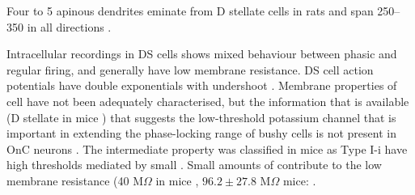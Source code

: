 

Four to 5 apinous dendrites eminate from D stellate cells in rats and span 250--350 \um in all directions \citep{DoucetRyugo:1997}.

Intracellular recordings in DS cells shows mixed behaviour between phasic and
regular firing, and generally have low membrane resistance.  DS cell action
potentials have double exponentials with undershoot
\citep{PaoliniClark:1999,WuOertel:1984}.  Membrane properties of \OnC cell have
not been adequately characterised, but the information that is available (D
stellate in mice \citealt{OertelWuEtAl:1990}) that suggests the low-threshold
potassium channel that is important in extending the phase-locking range of
bushy cells \citep{ManisMarx:1991,Oertel:1983} is not present in OnC neurons
\citep{WhiteYoungEtAl:1994}.  The intermediate property was classified in mice
as Type I-i have high thresholds mediated by small \IKLT
\citep{RothmanManis:2003b}.
Small amounts of \IKLT contribute to the low membrane resistance (40 M$\Omega$ in mice \citealt{OertelWuEtAl:1990},  $96.2 \pm 27.8$ M$\Omega$ mice: \citealt{FerragamoGoldingEtAl:1998a}.




